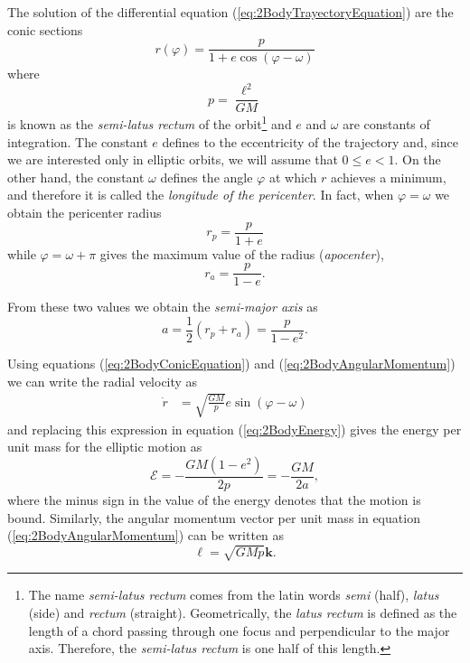The solution of the differential equation (\ref{eq:2BodyTrayectoryEquation}) are the conic sections
\begin{equation}
r(\varphi) = \frac{p}{ 1 + e \cos (\varphi - \omega ) } \label{eq:2BodyConicEquation}
\end{equation}
where 
\begin{equation}
p = \frac{\ell ^2}{GM} 
\end{equation}
is known as the \textit{semi-latus rectum} of the orbit\footnote{The name \textit{semi-latus rectum} comes from the latin words \textit{semi} (half), \textit{latus} (side) and \textit{rectum} (straight). Geometrically, the \textit{latus rectum} is defined as the length of a chord passing through one focus and perpendicular to the major axis. Therefore, the \textit{semi-latus rectum} is one half of this length.} and $e$ and $\omega$ are constants of integration. The constant $e$ defines to the eccentricity of the trajectory and, since we are interested only in elliptic orbits, we will assume that $0\leq e < 1$. On the other hand, the constant $\omega$ defines the angle $\varphi$ at which $r$ achieves a minimum, and therefore it is called the \textit{longitude of the pericenter}. In fact, when $\varphi = \omega$ we obtain the pericenter radius
\begin{equation}
r_{p} = \frac{p}{1+e}
\end{equation}
while $\varphi=\omega + \pi$ gives the maximum value of the radius (\textit{apocenter}),
\begin{equation}
 r_{a} = \frac{p}{1-e}.
 \end{equation} 

From these two values we obtain the \textit{semi-major axis} as
\begin{equation}
a = \frac{1}{2} \left( r_{p} + r_{a} \right) = \frac{p}{1-e^2}.
\end{equation}

Using equations (\ref{eq:2BodyConicEquation}) and (\ref{eq:2BodyAngularMomentum}) we can write the radial velocity as
\begin{align}
\dot{r} &= \sqrt{\frac{GM}{p}} e \sin (\varphi - \omega) \label{eq:2BodyRadialVelocity} 
\end{align}
and replacing this expression in equation (\ref{eq:2BodyEnergy}) gives the energy per unit mass for the elliptic motion as
\begin{equation}
\mathcal{E} = -\frac{GM (1-e^2)}{2p} = -\frac{GM}{2a},
\end{equation}
where the minus sign in the value of the energy denotes that the motion is bound. Similarly, the angular momentum vector per unit mass in equation (\ref{eq:2BodyAngularMomentum}) can be written as
\begin{equation}
 \boldsymbol{\ell} = \sqrt{GMp} \textbf{k}.
 \end{equation} 
 


